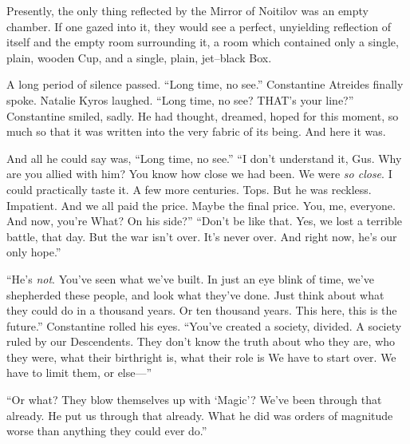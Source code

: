 Presently, the only thing reflected by the Mirror of Noitilov was an empty chamber. If one gazed into it, they would see a perfect, unyielding reflection of itself and the empty room surrounding it, a room which contained only a single, plain, wooden Cup, and a single, plain, jet\mbox{--}black Box.
\simpleline	
{}
\simpleline	
{}

A long period of silence passed.
\SomeVSpace
“Long time, no see.” Constantine Atreides finally spoke.
\SmallVSpace
Natalie Kyros laughed. “Long time, no see? THAT’s your line?”
\SmallVSpace
Constantine smiled, sadly. He had thought, dreamed, hoped for this moment, so much so that it was written into the very fabric of its being. And here it was.

And all he could say was, “Long time, no see.”
\SomeVSpace
“I don’t understand it, Gus. Why are you allied with him? You know how close we had been. We were \emph{so close}. I could practically taste it. A few more centuries. Tops. But he was reckless. Impatient. And we all paid the price. Maybe the final price. You, me, everyone. And now, you’re{\el} What? On his side?”
\SmallVSpace
“Don’t be like that. Yes, we lost a terrible battle, that day. But the war isn’t over. It’s never over. And right now, he’s our only hope.”

“He’s \emph{not}. You’ve seen what we’ve built. In just an eye blink of time, we’ve shepherded these people, and look what they’ve done. Just think about what they could do in a thousand years. Or ten thousand years. This here, this is the future.”
\SmallVSpace
Constantine rolled his eyes. “You’ve created a society, divided. A society ruled by our Descendents. They don’t know the truth about who they are, who they were, what their birthright is, what their role is{\el} We have to start over. We have to limit them, or else\mbox{---}”

“Or what? They blow themselves up with ‘Magic’? We’ve been through that already. He put us through that already. What he did was orders of magnitude worse than anything they could ever do.”

